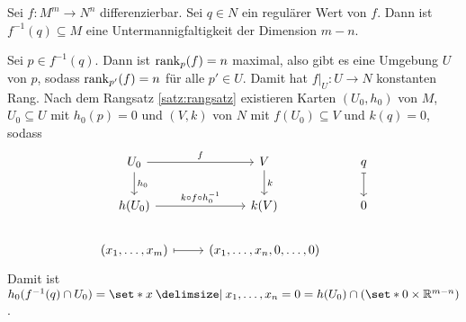 \begin{satz}[name={vom regulären Wert}]
	Sei $f \colon M^m \to N^n$ differenzierbar.
	Sei $q \in N$ ein regulärer Wert von $f$.
	Dann ist $f^{-1}(q) \subseteq M$ eine Untermannigfaltigkeit der Dimension $m-n$.
\end{satz}
\begin{beweis}
	Sei $p \in f^{-1}(q)$.
	Dann ist $\operatorname{rank}_p(f) = n$ maximal, also gibt es eine Umgebung $U$ von $p$, sodass $\operatorname{rank}_{p'}(f) = n$ für alle $p' \in U$.
	Damit hat $f|_U \colon U \to N$ konstanten Rang.
	Nach dem Rangsatz \ref{satz:rangsatz} existieren Karten $(U_0,h_0)$ von $M$, $U_0 \subseteq U$ mit $h_0(p)=0$ und $(V,k)$ von $N$ mit $f(U_0) \subseteq V$ und $k(q)=0$, sodass
	\[
		\begin{tikzcd}
			U_0 \rar["f"] \dar["h_0"] & V \dar["k"] & q \dar[mapsto] \\
			h(U_0) \rar["k \circ f \circ h_0^{-1}"] & k(V) &  0 \\
			(x_1, \ldots ,x_m) \rar[mapsto] & (x_1, \ldots ,x_n, 0, \ldots ,0)
		\end{tikzcd}
	\]
	Damit ist $h_0(f^{-1}(q) \cap U_0) = \set*{x \given x_1, \ldots ,x_n=0} = h(U_0) \cap \enbrace*{\set*{0} \times \mathbb{R}^{m-n}}$.
\end{beweis}

